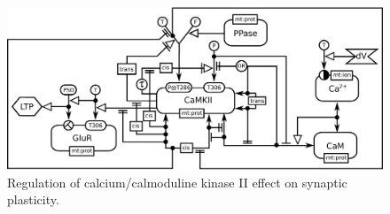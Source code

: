 \begin{figure}[H]
  \centering
  \vspace*{-0.75em}
  \includegraphics[scale=0.45]{examples/CaMKII-intro-new-2}
   \caption{Regulation of calcium/calmoduline kinase II effect on synaptic plasticity.}
  \label{fig:CaMKII}
\end{figure}